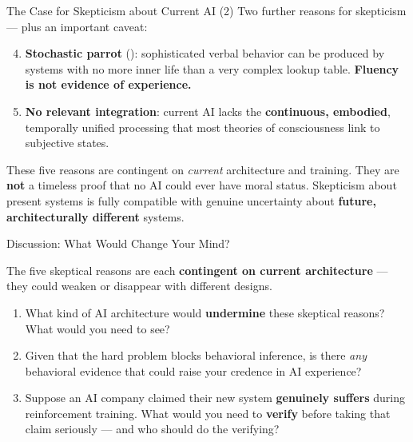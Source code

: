\documentclass[aspectratio=169,11pt]{beamer}
\begin{document}
\begin{frame}[shrink=5]{The Case for Skepticism about Current AI (2)}
Two further reasons for skepticism --- plus an important caveat:

\vspace{0.1cm}
\begin{enumerate}
    \setcounter{enumi}{3}
    \item \textbf{Stochastic parrot} (\textcite{bender_stochastic_parrots_2021}): sophisticated verbal behavior can be produced by systems with no more inner life than a very complex lookup table. \textbf{Fluency is not evidence of experience.}

    \vspace{0.1cm}
    \item \textbf{No relevant integration}: current AI lacks the \textbf{continuous, embodied}, temporally unified processing that most theories of consciousness link to subjective states.
\end{enumerate}

\vspace{0.15cm}
\begin{probox}
\small
These five reasons are contingent on \emph{current} architecture and training. They are \textbf{not} a timeless proof that no AI could ever have moral status. Skepticism about present systems is fully compatible with genuine uncertainty about \textbf{future, architecturally different} systems.
\end{probox}
\end{frame}

\begin{frame}{Discussion: What Would Change Your Mind?}
\begin{discussionbox}[Discussion]
\small
The five skeptical reasons are each \textbf{contingent on current architecture} --- they could weaken or disappear with different designs.
\begin{enumerate}
    \item What kind of AI architecture would \textbf{undermine} these skeptical reasons? What would you need to see?
    \item Given that the hard problem blocks behavioral inference, is there \emph{any} behavioral evidence that could raise your credence in AI experience?
    \item Suppose an AI company claimed their new system \textbf{genuinely suffers} during reinforcement training. What would you need to \textbf{verify} before taking that claim seriously --- and who should do the verifying?
\end{enumerate}
\end{discussionbox}
\end{frame}
\end{document}
